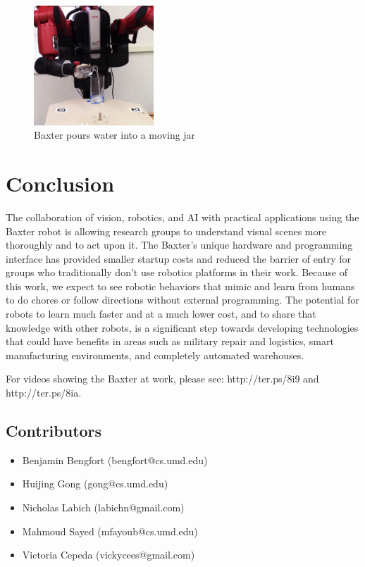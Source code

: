 \documentclass[DIV=calc, fontsize=12pt, twocolumn]{scrartcl}
\begin{document}
\begin{figure}
	\centering
	\includegraphics[width=0.40\textwidth]{pour.png}
    \caption{\textsf{Baxter pours water into a moving jar}}
    \label{fig:pour}
    \vspace{-.25in}
\end{figure}

\section*{Conclusion}

The collaboration of vision, robotics, and AI with practical applications using the Baxter robot is allowing research groups to understand visual scenes more thoroughly and to act upon it. The Baxter's unique hardware and programming interface has provided smaller startup costs and reduced the barrier of entry for groups who traditionally don't use robotics platforms in their work. Because of this work, we expect to see robotic behaviors that mimic and learn from humans to do chores or follow directions without external programming. The potential for robots to learn much faster and at a much lower cost, and to share that knowledge with other robots, is a significant step towards developing technologies that could have benefits in areas such as military repair and logistics, smart manufacturing environments, and completely automated warehouses.

For videos showing the Baxter at work, please see: http://ter.ps/8i9 and http://ter.ps/8ia.






\subsection*{Contributors}

\begin{itemize}[leftmargin=*,label={},noitemsep]
\item Benjamin Bengfort (bengfort@cs.umd.edu)
\item Huijing Gong (gong@cs.umd.edu)
\item Nicholas Labich (labichn@gmail.com)
\item Mahmoud Sayed (mfayoub@cs.umd.edu)
\item Victoria Cepeda (vickycees@gmail.com)
\end{itemize}

\end{document}
